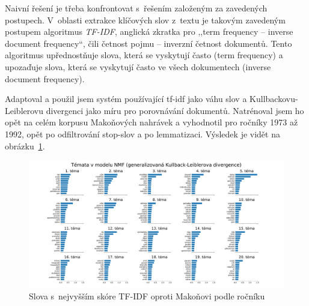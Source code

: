 Naivní řešení je třeba konfrontovat s~řešením založeným za zavedených postupech.
V~oblasti extrakce klíčových slov z~textu je takovým zavedeným postupem
algoritmus \textit{TF-IDF}\cite{Beel2016-11Resea-32348}, anglická zkratka pro
,,term frequency -- inverse document frequency``, čili četnost pojmu -- inverzní
četnost dokumentů. Tento algoritmus upřednostňuje slova, která se vyskytují
často (term frequency) a upozaďuje slova, která se vyskytují často ve všech
dokumentech (inverse document frequency).

Adaptoval a použil jsem systém používající tf-idf jako váhu slov a
Kullbackovu-Leiblerovu divergenci jako míru pro porovnávání dokumentů.
Natrénoval jsem ho opět na celém korpusu Makoňových nahrávek a vyhodnotil pro
ročníky 1973 až 1992, opět po odfiltrování stop-slov a po lemmatizaci. Výsledek
je vidět na obrázku~\ref{fig:topic-by-year-kld}.

\begin{figure}[htpb]
\includegraphics[scale=0.32, angle=90]{rc/topics-by-year-kld.pdf}
\caption{Slova s~nejvyšším skóre TF-IDF oproti Makoňovi podle ročníku}
\label{fig:topic-by-year-kld}
\end{figure}







